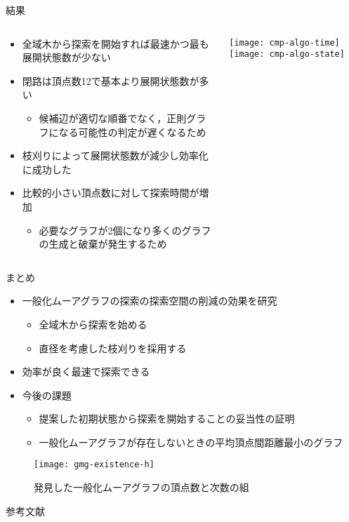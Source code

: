 \begin{frame}{結果}
  \begin{columns}[T]
    \begin{column}{.5\textwidth}
      \begin{itemize}
      \item 全域木から探索を開始すれば最速かつ最も展開状態数が少ない
      \item 閉路は頂点数12で基本より展開状態数が多い
        \begin{itemize}
        \item 候補辺が適切な順番でなく，正則グラフになる可能性の判定が遅くなるため
        \end{itemize}
        \medskip
      \item 枝刈りによって展開状態数が減少し効率化に成功した
      \item 比較的小さい頂点数に対して探索時間が増加
        \begin{itemize}
        \item 必要なグラフが2個になり多くのグラフの生成と破棄が発生するため
        \end{itemize}
      \end{itemize}
    \end{column}
    \begin{column}{.5\textwidth}
      \centering
      \texttt{[image: cmp-algo-time]}
      \vfill
      \texttt{[image: cmp-algo-state]}
    \end{column}
  \end{columns}
\end{frame}

\begin{frame}{まとめ}
  \begin{itemize}
  \item 一般化ムーアグラフの探索の探索空間の削減の効果を研究
    \begin{itemize}
    \item 全域木から探索を始める
    \item 直径を考慮した枝刈りを採用する
    \end{itemize}
  \item[] 効率が良く最速で探索できる
  \item 今後の課題
    \begin{itemize}
    \item 提案した初期状態から探索を開始することの妥当性の証明
    \item 一般化ムーアグラフが存在しないときの平均頂点間距離最小のグラフ
    \end{itemize}
  \end{itemize}
  \begin{figure}
    \centering
    \texttt{[image: gmg-existence-h]}
    \caption{発見した一般化ムーアグラフの頂点数と次数の組}
  \end{figure}
\end{frame}

\appendix

\begin{frame}[allowframebreaks]{参考文献}
  
\end{frame}


